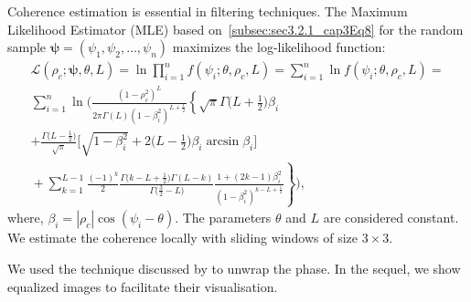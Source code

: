 \documentclass[remotesensing,article,submit,pdftex,moreauthors]{Definitions/mdpi}
\begin{document}
Coherence estimation is essential in filtering techniques. 
The Maximum Likelihood Estimator (MLE) based on~\eqref{subsec:sec3.2.1_cap3Eq8} 
for the random sample  
$\bm{\psi} = (\psi_1, \psi_2, \dots, \psi_n)$ maximizes the log-likelihood function:
\begin{multline}
\mathcal{L}(\rho_c; \bm{\psi}, \theta, L) = \ln \prod_{i=1}^{n} f(\psi_i; \theta, \rho_c, L) = \sum_{i=1}^{n} \ln f(\psi_i; \theta, \rho_c, L) = \\ 
\sum_{i=1}^{n}\ln\Bigg(\frac{(1-\rho_c^2)^L}{2\pi\Gamma(L)(1-\beta_i^2)^{L+\frac{1}{2}}}\left\lbrace \sqrt{\pi}\Gamma\Big(L+\frac{1}{2}\Big)\beta_i\right.\\
	+\frac{\Gamma\big(L-\frac{1}{2}\big) }{\sqrt{\pi}}\bigg[ \sqrt{1-\beta_i^2}+2\Big(L-\frac{1}{2}\Big)\beta_i\arcsin\beta_i\bigg]\\ 
	\mbox{}+\sum_{k=1}^{L-1}\frac{(-1)^k}{2}\frac{\Gamma\big( k-L+\frac{1}{2}\big) \Gamma(L-k)}{\Gamma\big( \frac{3}{2}-L\big) }
	\left.\frac{1+(2k-1)\beta_i^2}{(1-\beta_i^2)^{k-L+\frac{1}{2}}}\right\rbrace\Bigg),
\label{eq:LogLikelihood}
\end{multline}
where, $\beta_i=|\rho_c|\cos(\psi_i-\theta)$.
The parameters $\theta$ and $L$ are considered constant. 
We estimate the coherence locally 
with sliding windows of size 
$3 \times 3$. 

%
%
%

We used the technique 
discussed by \citet{DomnguezGuzmn2009}
to unwrap the phase. 
In the sequel, we show equalized images to facilitate their visualisation.
\end{document}
